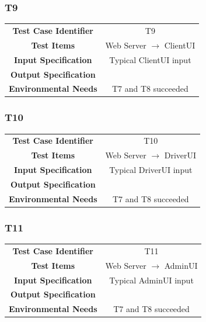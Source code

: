 \documentclass{article}
\begin{document}
\subsubsection{T9}
\begin{adjustbox}{width=1.2\textwidth}	
	\begin{tabular}{*{2}{c}}
		\midrule
		\textbf{Test Case Identifier} & T9\\
		\textbf{Test Items} & Web Server $\rightarrow$ ClientUI\\
		\textbf{Input Specification} & Typical ClientUI input\\
		\textbf{Output Specification} & \\ %
		\textbf{Environmental Needs} & T7 and T8 succeeded\\
		\bottomrule
	\end{tabular}
\end{adjustbox}
\subsubsection{T10}
\begin{adjustbox}{width=1.2\textwidth}	
	\begin{tabular}{*{2}{c}}
		\midrule
		\textbf{Test Case Identifier} & T10\\
		\textbf{Test Items} & Web Server $\rightarrow$ DriverUI\\
		\textbf{Input Specification} & Typical DriverUI input\\
		\textbf{Output Specification} & \\ %
		\textbf{Environmental Needs} & T7 and T8 succeeded\\
		\bottomrule
	\end{tabular}
\end{adjustbox}
\subsubsection{T11}
\begin{adjustbox}{width=1.2\textwidth}	
	\begin{tabular}{*{2}{c}}
		\midrule
		\textbf{Test Case Identifier} & T11\\
		\textbf{Test Items} & Web Server $\rightarrow$ AdminUI\\
		\textbf{Input Specification} & Typical AdminUI input\\
		\textbf{Output Specification} & \\ %
		\textbf{Environmental Needs} & T7 and T8 succeeded\\
		\bottomrule
	\end{tabular}
\end{adjustbox}
\end{document}
